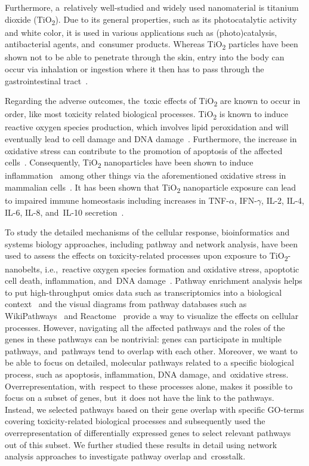 \documentclass[ijms,article,accept,moreauthors,pdftex]{Definitions/mdpi}
\begin{document}
Furthermore, a~relatively well-studied and widely used nanomaterial is titanium dioxide (TiO\textsubscript{2}). Due to its general properties, such as its photocatalytic activity and white color, it is used in various applications such as (photo)catalysis, antibacterial agents, and~consumer products. Whereas TiO\textsubscript{2} particles have been shown not to be able to penetrate through the skin, entry into the body can occur via inhalation or ingestion where it then has to pass through the gastrointestinal tract~\cite{Shakeel2015,Gupta2018}. 

Regarding the adverse outcomes, the~toxic effects of TiO\textsubscript{2} are known to occur in order, like most toxicity related biological processes. TiO\textsubscript{2} is known to induce reactive oxygen species production, which involves lipid peroxidation and will eventually lead to cell damage and DNA damage~\cite{Hou2019,LAzou2008}. Furthermore, the increase in oxidative stress can contribute to the promotion of apoptosis of the affected cells~\cite{Circu2010,Redza-Dutordoir2016}. Consequently, TiO\textsubscript{2} nanoparticles have been shown to induce inflammation~\cite{Yan2020,Baisch2014} among other things via the aforementioned oxidative stress in mammalian cells~\cite{Hou2019,Meena2015}. It has been shown that TiO\textsubscript{2} nanoparticle exposure can lead to impaired immune homeostasis including increases in TNF-$\alpha$, IFN-$\gamma$, IL-2, IL-4, IL-6, IL-8, and~IL-10 secretion~\cite{RothenRutishauser2007,Bettini2017,MedinaReyes2015}. 

To study the detailed mechanisms of the cellular response, bioinformatics and systems biology approaches, including pathway and network analysis, have been used to assess the effects on toxicity-related processes upon exposure to TiO\textsubscript{2}-nanobelts, i.e.,~reactive oxygen species formation and oxidative stress, apoptotic cell death, inflammation, and~DNA damage~\cite{Zhang2018,Liu2019}. Pathway enrichment analysis helps to put high-throughput omics data such as transcriptomics into a biological context~\cite{Khatri2012} and the visual diagrams from pathway databases such as WikiPathways~\cite{Martens2020} and Reactome~\cite{Fabregat2017} provide a way to visualize the effects on cellular processes. However, navigating all the affected pathways and the roles of the genes in these pathways can be nontrivial: genes can participate in multiple pathways, and~pathways tend to overlap with each other. Moreover, we want to be able to focus on detailed, molecular pathways related to a specific biological process, such as apoptosis, inflammation, DNA damage, and~oxidative stress. Overrepresentation, with~respect to these processes alone, makes it possible to focus on a subset of genes, but~it does not have the link to the pathways. Instead, we selected pathways based on their gene overlap with specific GO-terms covering toxicity-related biological processes and subsequently used the overrepresentation of differentially expressed genes to select relevant pathways out of this subset. We further studied these results in detail using network analysis approaches to investigate pathway overlap and~crosstalk.
\end{document}
